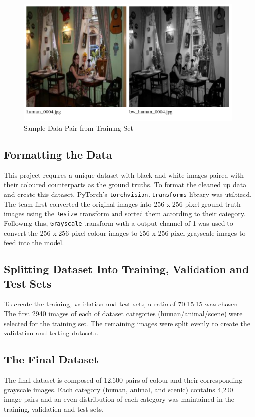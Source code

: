 \documentclass{article} %
\begin{document}
\begin{figure}[htbp]            %
  \centering
  \includegraphics[width=0.65\linewidth]{Figs/Data Example.png}
  \caption{Sample Data Pair from Training Set}
  \label{fig:data_example}
\end{figure}

\subsection{Formatting the Data}

This project requires a unique dataset with black-and-white images paired with their coloured counterparts as the ground truths. To format the cleaned up data and create this dataset, 
PyTorch's \verb|torchvision.transforms| library was utiltized. The team first converted the original images into 256 x 256 pixel ground truth images using the \verb|Resize| transform 
and sorted them according to their category. Following this, \verb|Grayscale| transform with a output channel of 1 was used to convert the 256 x 256 pixel colour images to 256 x 256 
pixel grayscale images to feed into the model. 

\subsection{Splitting Dataset Into Training, Validation and Test Sets}

To create the training, validation and test sets, a ratio of 70:15:15 was chosen. The first 2940 images of each of dataset categories (human/animal/scene) were selected for the training 
set. The remaining images were split evenly to create the validation and testing datasets. 

\subsection{The Final Dataset}

The final dataset is composed of 12,600 pairs of colour and their corresponding grayscale images. Each category (human, animal, and scenic) contains 4,200 image pairs and an even 
distribution of each category was maintained in the training, validation and test sets.
\end{document}
